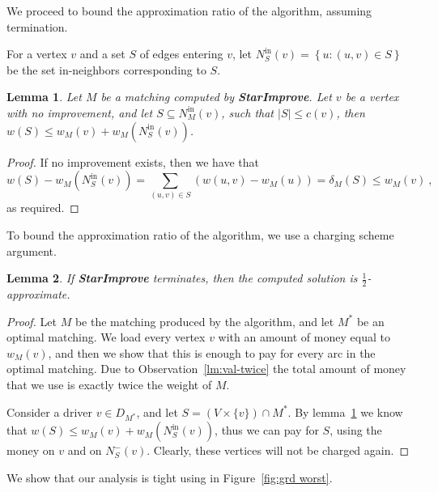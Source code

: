 \documentclass[11pt]{article}
\newtheorem{lemma}{Lemma}
\newcommand{\set}[1]{\left\{ #1 \right\}}
\newcommand{\abs}[1]{\left| #1 \right|}
\newcommand{\half}{\frac{1}{2}}
\newcommand{\nin}[1][M]{N^{\text{in}}_{#1}}
\begin{document}
We proceed to bound the approximation ratio of the algorithm, assuming
termination.

For a vertex $v$ and a set $S$ of edges entering $v$, let $\nin[S](v)
= \set{u : (u,v) \in S}$ be the set in-neighbors corresponding to $S$.

\begin{lemma}
\label{lm:no improve}
Let $M$ be a matching computed by \textbf{StarImprove}.  Let $v$ be a
vertex with no improvement, and let $S \subseteq \nin(v)$, such that
$\abs{S} \leq c(v)$, then $w(S) \leq w_M(v) + w_M(\nin[S](v))$.
\end{lemma}
\begin{proof}
If no improvement exists, then we have that 
\[
w(S) - w_M(\nin[S](v))
=    \sum_{(u,v) \in S} (w(u,v) - w_M(u))
=    \delta_M(S) 
\leq w_M(v)
~,
\]
as required.
\end{proof}

To bound the approximation ratio of the algorithm, we use a charging
scheme argument.

\begin{lemma}
If \textbf{StarImprove} terminates, then the computed solution is
$\half$-approximate.
\end{lemma}
\begin{proof}
Let $M$ be the matching produced by the algorithm, and let $M^*$ be an
optimal matching.  We load every vertex $v$ with an amount of money
equal to $w_M(v)$, and then we show that this is enough to pay for
every arc in the optimal matching.  Due to
Observation~\ref{lm:val-twice} the total amount of money that we use
is exactly twice the weight of $M$.

Consider a driver $v \in D_{M^*}$, and let $S = (V \times \{v\}) \cap
M^*$.  By lemma~\ref{lm:no improve} we know that $w(S) \leq w_M(v) +
w_M(\nin[S](v))$, thus we can pay for $S$, using the money on $v$ and
on $N^-_S(v)$.  Clearly, these vertices will not be charged again.
\end{proof}

We show that our analysis is tight using in Figure~\ref{fig:grd
worst}.
\end{document}
